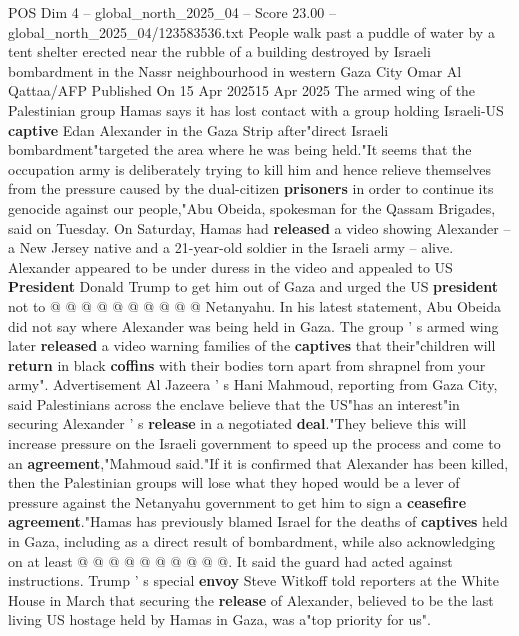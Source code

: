 \begin{textsample}{POS Dim 4 – global\_north\_2025\_04 – Score 23.00 – global\_north\_2025\_04/123583536.txt}  \label{ex:f4_pos_219}
People walk past a puddle of water by a tent shelter erected near the rubble of a building destroyed by Israeli bombardment in the Nassr neighbourhood in western Gaza City Omar Al Qattaa/AFP Published On 15 Apr 202515 Apr 2025 The armed wing of the Palestinian group Hamas says it has lost contact with a group holding Israeli-US \textbf{captive} Edan Alexander in the Gaza Strip after"direct Israeli bombardment"targeted the area where he was being held."It seems that the occupation army is deliberately trying to kill him and hence relieve themselves from the pressure caused by the dual-citizen \textbf{prisoners} in order to continue its genocide against our people,"Abu Obeida, spokesman for the Qassam Brigades, said on Tuesday.
On Saturday, Hamas had \textbf{released} a video showing Alexander -- a New Jersey native and a 21-year-old soldier in the Israeli army -- alive.
Alexander appeared to be under duress in the video and appealed to US \textbf{President} Donald Trump to get him out of Gaza and urged the US \textbf{president} not to @ @ @ @ @ @ @ @ @ @ Netanyahu.
In his latest statement, Abu Obeida did not say where Alexander was being held in Gaza.
The group ' s armed wing later \textbf{released} a video warning families of the \textbf{captives} that their"children will \textbf{return} in black \textbf{coffins} with their bodies torn apart from shrapnel from your army".
Advertisement Al Jazeera ' s Hani Mahmoud, reporting from Gaza City, said Palestinians across the enclave believe that the US"has an interest"in securing Alexander ' s \textbf{release} in a negotiated \textbf{deal}."They believe this will increase pressure on the Israeli government to speed up the process and come to an \textbf{agreement},"Mahmoud said."If it is confirmed that Alexander has been killed, then the Palestinian groups will lose what they hoped would be a lever of pressure against the Netanyahu government to get him to sign a \textbf{ceasefire} \textbf{agreement}."Hamas has previously blamed Israel for the deaths of \textbf{captives} held in Gaza, including as a direct result of bombardment, while also acknowledging on at least @ @ @ @ @ @ @ @ @ @.
It said the guard had acted against instructions.
Trump ' s special \textbf{envoy} Steve Witkoff told reporters at the White House in March that securing the \textbf{release} of Alexander, believed to be the last living US hostage held by Hamas in Gaza, was a"top priority for us".

\end{textsample}
